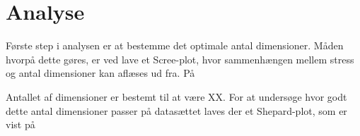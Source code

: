 \section*{Analyse}
\label{Analyse}
%
Første step i analysen er at bestemme det optimale antal dimensioner. Måden hvorpå dette gøres, er ved lave et Scree-plot, hvor sammenhængen mellem stress og antal dimensioner kan aflæses ud fra. På %


Antallet af dimensioner er bestemt til at være XX. For at undersøge hvor godt dette antal dimensioner passer på datasættet laves der et Shepard-plot, som er vist på %

